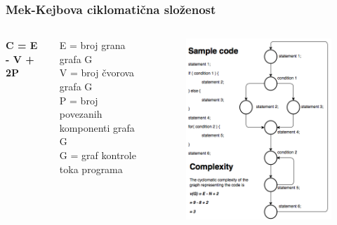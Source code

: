 \documentclass{beamer}
\begin{document}
\begin{frame}
\frametitle{Mek-Kejbova ciklomatična složenost}

\begin{columns}[c] %



\begin{center}
\textbf{C = E - V + 2P} 
\end{center}

E = broj grana grafa G \\
V = broj čvorova grafa G \\
P = broj povezanih komponenti grafa G \\
G = graf kontrole toka programa 

\begin{figure}
\includegraphics[width=1\linewidth]{mccabe.png}
\end{figure}

\end{columns}

\end{frame}
\end{document}
